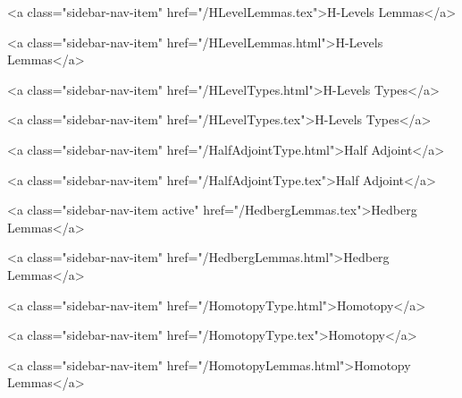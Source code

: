       
        
          <a class="sidebar-nav-item" href="/HLevelLemmas.tex">H-Levels Lemmas</a>
        
      
    
      
        
          <a class="sidebar-nav-item" href="/HLevelLemmas.html">H-Levels Lemmas</a>
        
      
    
      
        
          <a class="sidebar-nav-item" href="/HLevelTypes.html">H-Levels Types</a>
        
      
    
      
        
          <a class="sidebar-nav-item" href="/HLevelTypes.tex">H-Levels Types</a>
        
      
    
      
        
          <a class="sidebar-nav-item" href="/HalfAdjointType.html">Half Adjoint</a>
        
      
    
      
        
          <a class="sidebar-nav-item" href="/HalfAdjointType.tex">Half Adjoint</a>
        
      
    
      
        
          <a class="sidebar-nav-item active" href="/HedbergLemmas.tex">Hedberg Lemmas</a>
        
      
    
      
        
          <a class="sidebar-nav-item" href="/HedbergLemmas.html">Hedberg Lemmas</a>
        
      
    
      
        
          <a class="sidebar-nav-item" href="/HomotopyType.html">Homotopy</a>
        
      
    
      
        
          <a class="sidebar-nav-item" href="/HomotopyType.tex">Homotopy</a>
        
      
    
      
        
          <a class="sidebar-nav-item" href="/HomotopyLemmas.html">Homotopy Lemmas</a>
        
      
    
